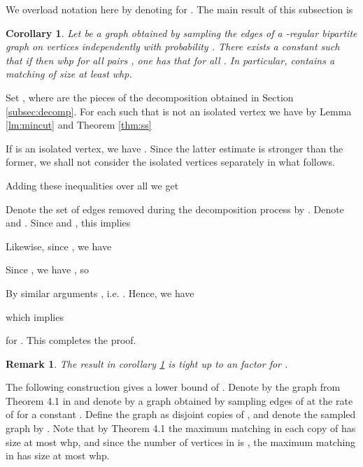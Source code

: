 \documentclass[11pt]{article}
\newtheorem{corollary}[theorem]{Corollary}
\newtheorem{remark}[theorem]{Remark}
\newenvironment{proof}{{\bf Proof:}}{\par}
\begin{document}
We overload notation here by denoting  for . The main result of this subsection is
\begin{corollary} \label{cor:unbalanced-ws}
Let  be a graph obtained by sampling the edges of a -regular bipartite graph  on  vertices independently with probability . There exists a constant  such that if  then whp for all pairs ,  one has that 
 for all . In particular,  contains a matching of size at least  whp.
\end{corollary}
\begin{proof}
Set , where  are the pieces of the decomposition obtained in Section \ref{subsec:decomp}. For each  such that  is not an isolated vertex we have by Lemma \ref{lm:mincut} and Theorem \ref{thm:ss}

If  is an isolated vertex, we have . Since the latter estimate is stronger than the former, we shall not consider the isolated vertices separately in what follows.

Adding these inequalities over all  we get

Denote the set of edges removed  during the decomposition process by . Denote  and . Since  and , this implies

Likewise, since , we have

Since , we have , so 

By similar arguments , i.e. . Hence, we have

which implies

for . This completes the proof.
\end{proof}

\begin{remark} \label{rmk:logd}
The result in corollary \ref{cor:unbalanced-ws} is tight up to an  factor for . 
\end{remark}
\begin{proof}
The following construction gives a lower bound of . Denote by  the graph from Theorem 4.1 in \cite{gkk:rbp08} and denote by  a graph obtained by sampling edges of  at the rate of  for a constant . Define the graph  as  disjoint copies of , and denote the sampled graph by . Note that by Theorem 4.1 the maximum matching in each copy of  has size at most  whp, and since the number of vertices in  is , the maximum matching in  has size at most  whp.
\end{proof}
\end{document}
